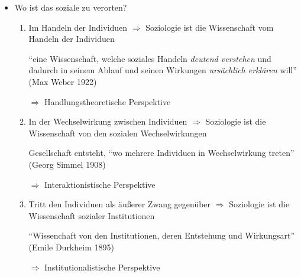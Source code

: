 \begin{itemize}
	\item
		Wo ist das soziale zu verorten?
\begin{enumerate}
	\item
		Im Handeln der Individuen $\Rightarrow$ Soziologie ist die Wissenschaft vom Handeln der Individuen

		\enquote{eine Wissenschaft, welche soziales Handeln \textit{deutend verstehen} und dadurch in seinem Ablauf und seinen Wirkungen \textit{ursächlich erklären} will} (Max Weber 1922)

		$\Rightarrow$
		Handlungstheoretische Perspektive
	\item
		In der Wechselwirkung zwischen Individuen $\Rightarrow$ Soziologie ist die Wissenschaft von den sozialen Wechselwirkungen

		Gesellschaft entsteht, \enquote{wo mehrere Individuen in Wechselwirkung treten} (Georg Simmel 1908)

		$\Rightarrow$
		Interaktionistische Perspektive

	\item
		Tritt den Individuen als äußerer Zwang gegenüber $\Rightarrow$ Soziologie ist die Wissenschaft sozialer Institutionen

		\enquote{Wissenchaft von den Institutionen, deren Entstehung und Wirkungsart} (Emile Durkheim 1895)

		$\Rightarrow$
		Institutionalistische Perspektive

\end{enumerate}
\end{itemize}

